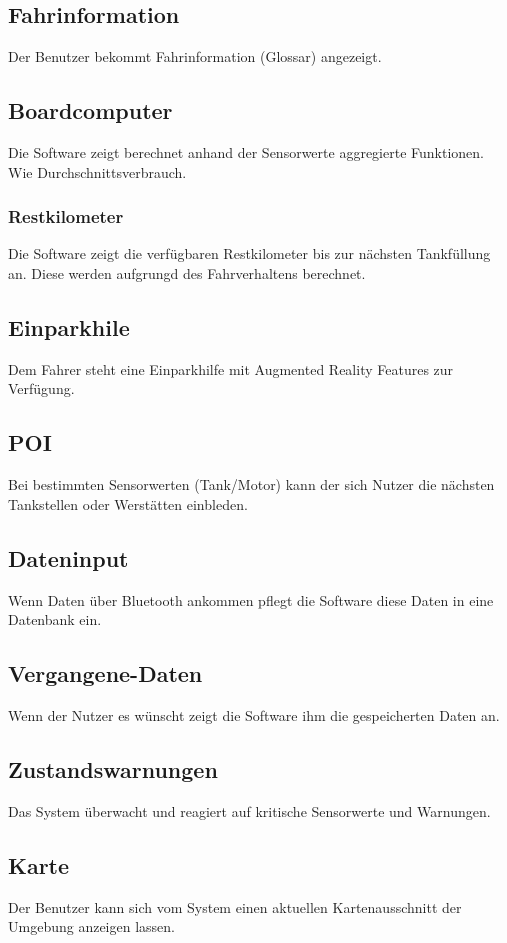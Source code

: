 \documentclass[pflichtenheft.tex]{subfiles}
\begin{document}
\subsection{\mkfa Fahrinformation} Der Benutzer bekommt Fahrinformation (Glossar) angezeigt.

\subsection{\mkfa Boardcomputer} Die Software zeigt berechnet anhand der Sensorwerte aggregierte Funktionen. Wie Durchschnittsverbrauch.

\subsubsection{\mkfa Restkilometer} Die Software zeigt die verfügbaren Restkilometer bis zur nächsten Tankfüllung an. Diese werden aufgrungd des Fahrverhaltens berechnet.

\subsection{\mkfa Einparkhile} Dem Fahrer steht eine Einparkhilfe mit Augmented Reality Features zur Verfügung.

\subsection{\mkfa POI} Bei bestimmten Sensorwerten (Tank/Motor) kann der sich Nutzer die nächsten Tankstellen oder Werstätten einbleden.

\subsection{\mkfa Dateninput}
Wenn Daten über Bluetooth ankommen pflegt die Software diese Daten in eine Datenbank ein. 
\subsection{\mkfa Vergangene-Daten}
Wenn der Nutzer es wünscht zeigt die Software ihm die gespeicherten Daten an.
\subsection{\mkfa Zustandswarnungen}
Das System überwacht und reagiert auf kritische Sensorwerte und Warnungen.

\subsection{\mkfa Karte}
Der Benutzer kann sich vom System einen aktuellen Kartenausschnitt der Umgebung anzeigen lassen.
\end{document}
